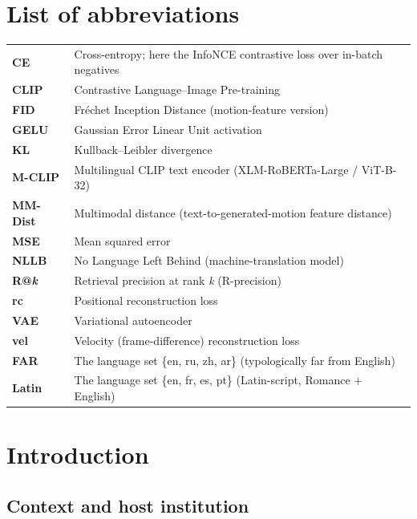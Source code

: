 \documentclass[11pt,a4paper]{report}
\begin{document}
\chapter*{List of abbreviations}
\begingroup
\setlength{\tabcolsep}{10pt}
\renewcommand{\arraystretch}{1.25}
\noindent
\begin{longtable}{@{}p{2.6cm}p{11.5cm}@{}}
\textbf{CE} & Cross-entropy; here the InfoNCE contrastive loss over in-batch negatives \\
\textbf{CLIP} & Contrastive Language--Image Pre-training \\
\textbf{FID} & Fréchet Inception Distance (motion-feature version) \\
\textbf{GELU} & Gaussian Error Linear Unit activation \\
\textbf{KL} & Kullback--Leibler divergence \\
\textbf{M-CLIP} & Multilingual CLIP text encoder (XLM-RoBERTa-Large / ViT-B-32) \\
\textbf{MM-Dist} & Multimodal distance (text-to-generated-motion feature distance) \\
\textbf{MSE} & Mean squared error \\
\textbf{NLLB} & No Language Left Behind (machine-translation model) \\
\textbf{R@\emph{k}} & Retrieval precision at rank \emph{k} (R-precision) \\
\textbf{rc} & Positional reconstruction loss \\
\textbf{VAE} & Variational autoencoder \\
\textbf{vel} & Velocity (frame-difference) reconstruction loss \\
\textbf{FAR} & The language set \{en, ru, zh, ar\} (typologically far from English) \\
\textbf{Latin} & The language set \{en, fr, es, pt\} (Latin-script, Romance + English) \\
\end{longtable}
\endgroup

\cleardoublepage
{}

\chapter{Introduction}

\section{Context and host institution}
\end{document}
